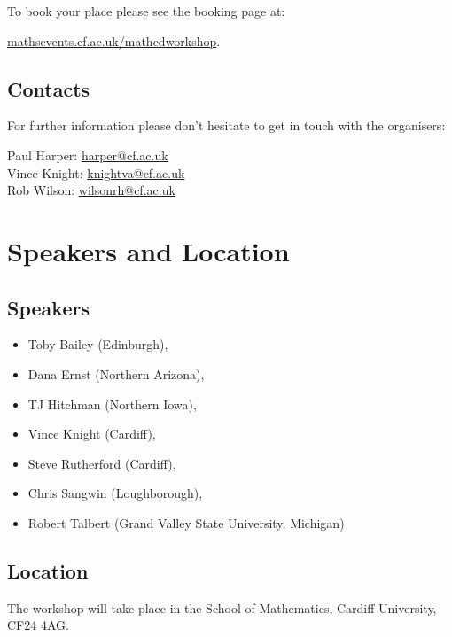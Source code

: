 \documentclass[a4paper]{leaflet}
\begin{document}
To book your place please see the booking page at:
\begin{center}
\url{mathsevents.cf.ac.uk/mathedworkshop}.
\end{center}

\subsection{Contacts}
For further information please don't hesitate to get in touch with the organisers:

\begin{center}
Paul Harper: \url{harper@cf.ac.uk}\\
Vince Knight: \url{knightva@cf.ac.uk}\\
Rob Wilson: \url{wilsonrh@cf.ac.uk}
\end{center}

\newpage
\section{Speakers and Location}
\subsection{Speakers}

\begin{itemize}
\item Toby Bailey (Edinburgh),
\item Dana Ernst (Northern Arizona),
\item TJ Hitchman (Northern Iowa),
\item Vince Knight (Cardiff),
\item Steve Rutherford (Cardiff),
\item Chris Sangwin (Loughborough),
\item Robert Talbert (Grand Valley State University, Michigan)
\end{itemize}

\subsection{Location}

The workshop will take place in the School of Mathematics, Cardiff University, CF24 4AG.\\
\end{document}
